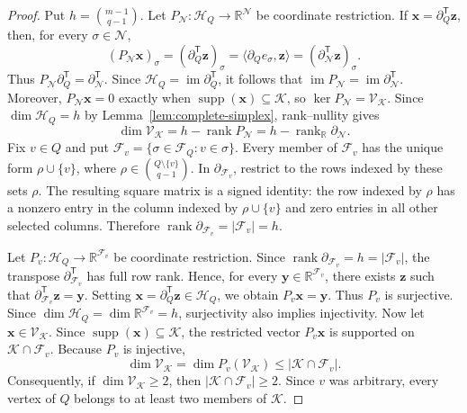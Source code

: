 \documentclass[11pt]{article}
\newcommand{\rank}{\operatorname{rank}}
\newcommand{\im}{\operatorname{im}}
\newcommand{\Ker}{\operatorname{ker}}
\newcommand{\supp}{\operatorname{supp}}
\newcommand{\bd}{\partial}
\newcommand{\calF}{\mathcal{F}}
\newcommand{\calK}{\mathcal{K}}
\newcommand{\calN}{\mathcal{N}}
\newcommand{\scrH}{\mathscr{H}}
\newcommand{\scrV}{\mathscr{V}}
\begin{document}
\begin{proof}
Put \(h=\binom{m-1}{q-1}\). Let \(P_{\calN}:\scrH_Q\to\mathbb R^{\calN}\) be coordinate
restriction. If \(\mathbf x=\bd_Q^{\mathsf T}\mathbf z\), then, for
every \(\sigma\in\calN\),
\[
(P_{\calN}\mathbf x)_\sigma
=(\bd_Q^{\mathsf T}\mathbf z)_\sigma
=\langle\bd_Qe_\sigma,\mathbf z\rangle
=(\bd_{\calN}^{\mathsf T}\mathbf z)_\sigma.
\]
Thus \(P_{\calN}\bd_Q^{\mathsf T}=\bd_{\calN}^{\mathsf T}\).
Since \(\scrH_Q=\im\bd_Q^{\mathsf T}\), it follows that
\(\im P_{\calN}=\im\bd_{\calN}^{\mathsf T}\). Moreover,
\(P_{\calN}\mathbf x=0\) exactly when
\(\supp(\mathbf x)\subseteq\calK\), so
\(\Ker P_{\calN}=\scrV_{\calK}\). Since
\(\dim\scrH_Q=h\) by Lemma~\ref{lem:complete-simplex}, rank--nullity
gives
\[
\dim\scrV_{\calK}
=h-\rank P_{\calN}
=h-\rank_{\mathbb R}\bd_{\calN}.
\]
Fix \(v\in Q\) and put $\calF_v=\{\sigma\in\calF_Q:v\in\sigma\}.$
Every member of \(\calF_v\) has the unique form
\(\rho\cup\{v\}\), where
\(\rho\in\binom{Q\setminus\{v\}}{q-1}\). In
\(\bd_{\calF_v}\), restrict to the rows indexed by these sets \(\rho\).
The resulting square matrix is a signed identity: the row indexed by
\(\rho\) has a nonzero entry in the column indexed by
\(\rho\cup\{v\}\) and zero entries in all other selected columns.
Therefore $\rank\bd_{\calF_v}=|\calF_v|=h.$

Let \(P_v:\scrH_Q\to\mathbb R^{\calF_v}\) be coordinate restriction.
Since \(\rank\bd_{\calF_v}=h=|\calF_v|\), the transpose
\(\bd_{\calF_v}^{\mathsf T}\) has full row rank. Hence, for every
\(\mathbf y\in\mathbb R^{\calF_v}\), there exists \(\mathbf z\) such
that \(\bd_{\calF_v}^{\mathsf T}\mathbf z=\mathbf y\). Setting
\(\mathbf x=\bd_Q^{\mathsf T}\mathbf z\in\scrH_Q\), we obtain
\(P_v\mathbf x=\mathbf y\). Thus \(P_v\) is surjective. Since
\(\dim\scrH_Q=\dim\mathbb R^{\calF_v}=h\), surjectivity also implies
injectivity.
Now let \(\mathbf x\in\scrV_{\calK}\). Since
\(\supp(\mathbf x)\subseteq\calK\), the restricted vector
\(P_v\mathbf x\) is supported on \(\calK\cap\calF_v\). Because \(P_v\)
is injective,
\[
\dim\scrV_{\calK}
=
\dim P_v(\scrV_{\calK})
\leq|\calK\cap\calF_v|.
\]
Consequently, if \(\dim\scrV_{\calK}\geq2\), then
\(|\calK\cap\calF_v|\geq2\). Since \(v\) was arbitrary, every vertex
of \(Q\) belongs to at least two members of \(\calK\).
\end{proof}
	
\end{document}
